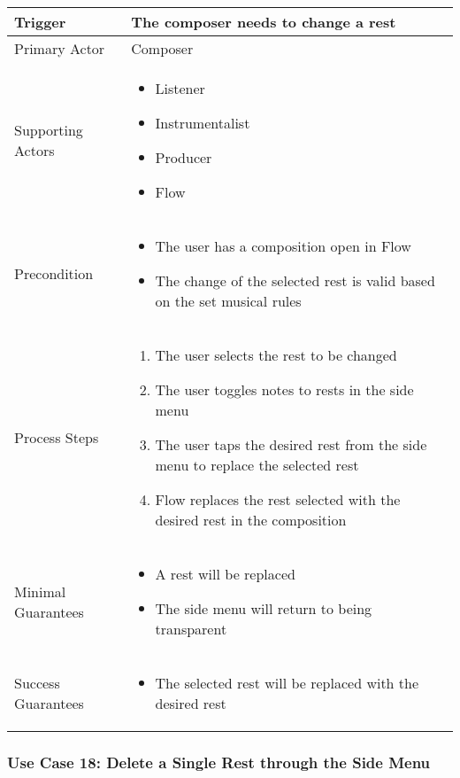 \begin{tabularx}{\textwidth}{|X|X|}
\hline
Trigger & 
The composer needs to change a rest \\
\hline
Primary Actor & 
Composer\\
\hline
Supporting Actors & 
\begin{itemize}
\item Listener
\item Instrumentalist
\item Producer
\item Flow
\end{itemize} \\
\hline
Precondition & 
\begin{itemize}
\item The user has a composition open in Flow  
\item The change of the selected rest is valid based on the set musical rules
\end{itemize} \\
\hline
Process Steps & 
\begin{enumerate}
\item The user selects the rest to be changed 
\item The user toggles notes to rests in the side menu
\item The user taps the desired rest from the side menu to replace the selected rest
\item Flow replaces the rest selected with the desired rest in the composition
\end{enumerate} \\
\hline
Minimal Guarantees & 
\begin{itemize}
  \item A rest will be replaced
  \item The side menu will return to being transparent
\end{itemize} \\
\hline
Success Guarantees & 
\begin{itemize}
  \item The selected rest will be replaced with the desired rest
\end{itemize} \\
\hline
\end{tabularx}


\subsubsection{Use Case 18: Delete a Single Rest through the Side Menu}


